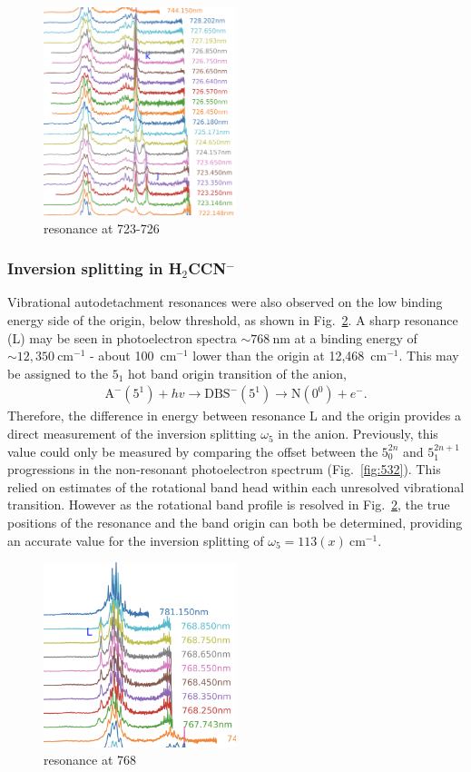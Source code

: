 \documentclass[journal=jpcafh,manuscript=article,layout=onecolumn, 12pt]{achemso}
\begin{document}
\begin{figure}
	\includegraphics[width=0.5\textwidth]{scripts/723}
	\caption{resonance at 723-726}
	\label{fig:723}
\end{figure}

\subsubsection{Inversion splitting in H$_2$CCN$^-$}
Vibrational autodetachment resonances were also observed on the low binding energy side of the origin, below threshold, as shown in Fig.~\ref{fig:768}. A sharp resonance (L) may be seen in photoelectron spectra $\sim 768~$nm at a binding energy of $\sim 12,350~$cm$^{-1}$ - about 100~cm$^{-1}$ lower than the origin at 12,468~cm$^{-1}$. This may be assigned to the $5_1$ hot band origin transition of the anion, 
\begin{align*}
	\text{A}^-(5^1) +hv \rightarrow \text{DBS}^-(5^1) \rightarrow \text{N}(0^0) + e^-.
\end{align*}
Therefore, the difference in energy between resonance L and the origin provides a direct measurement of the inversion splitting $\omega_5$ in the anion. Previously, this value could only be measured by comparing the offset between the $5^{2n}_0$ and $5^{2n+1}_1$ progressions in the non-resonant photoelectron spectrum (Fig.~\ref{fig:532}). This relied on estimates of the rotational band head within each unresolved vibrational transition. However as the rotational band profile is resolved in Fig.~\ref{fig:768}, the true positions of the resonance and the band origin can both be determined, providing an accurate value for the inversion splitting of $\omega_5 = 113(x)~$cm$^{-1}$.

\begin{figure}
	\includegraphics[width=0.5\textwidth]{scripts/768}
	\caption{resonance at 768}
	\label{fig:768}
\end{figure}
\end{document}
